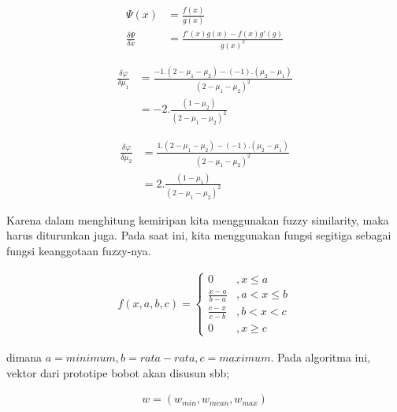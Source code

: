 \begin{align}
\label{eq:}
	\Psi(x) &= \frac{f(x)}{g(x)} \nonumber \\
	\frac{\delta \Psi}{\delta x} &=  
	\frac{f'(x)g(x) - f(x)g'(g)}{g(x)^2}
\end{align}

\begin{align}
\label{eq:}
	\frac{\delta \varphi}{\delta \mu_1} &=  
	\frac{-1 . (2 - \mu_1 - \mu_2) - (-1).(\mu_2-\mu_1)}
	{(2 - \mu_1 - \mu_2)^2} \nonumber \\
	 &=  
	-2.\frac{(1 - \mu_2)}{(2 - \mu_1 - \mu_2)^2}
\end{align}

\begin{align}
\label{eq:}
	\frac{\delta \varphi}{\delta \mu_2} &=  
	\frac{1 . (2 - \mu_1 - \mu_2) - (-1).(\mu_2-\mu_1)}
	{(2 - \mu_1 - \mu_2)^2} \nonumber \\
	 &=  
	2.\frac{(1 - \mu_1)}{(2 - \mu_1 - \mu_2)^2}
\end{align}

Karena dalam menghitung kemiripan kita menggunakan fuzzy similarity, maka harus
diturunkan juga. Pada saat ini, kita menggunakan fungsi segitiga
sebagai fungsi keanggotaan fuzzy-nya.

\begin{align}
\label{eq:}
	f(x, a, b, c) = \left\{ 
	\begin{array}{ll}
	0 & , x \leq a\\
	\frac{x - a}{b - a} & , a < x \leq b \\
	\frac{c - x}{c - b} & , b < x < c \\
	0 & , x \geq c
	\end{array}
\end{align}

dimana $a = minimum, b = rata-rata, c = maximum$. Pada algoritma ini,
vektor dari prototipe bobot akan disusun sbb;

\begin{align}
\label{eq:}
	w = (w_{min}, w_{mean}, w_{max})
\end{align}
 

